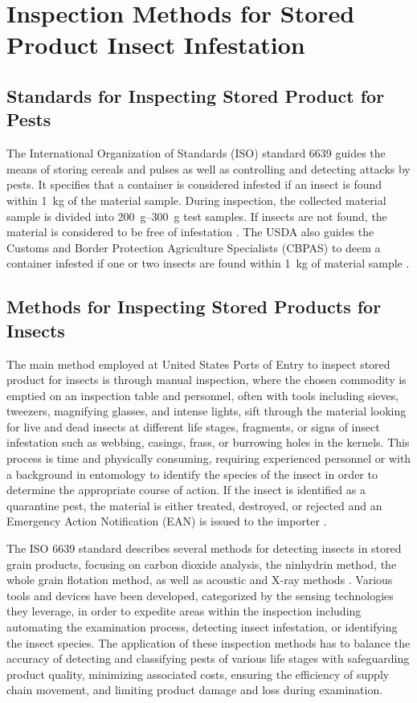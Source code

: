 \documentclass[../Vibro-Acoustic Signatures and Detection Algorithms for Stored Product Insects.tex]{subfiles}
\begin{document}
\newpage
\section{Inspection Methods for Stored Product Insect Infestation}

\subsection{Standards for Inspecting Stored Product for Pests}

The International Organization of Standards (ISO) standard 6639 guides the means of storing cereals and pulses as well as controlling and detecting attacks by pests. It specifies that a container is considered infested if an insect is found within \SI{1}{\kilo\gram} of the material sample. During inspection, the collected material sample is divided into \SIrange{200}{300}{\gram} test samples. If insects are not found, the material is considered to be free of infestation \cite{ISO6639Cereals1986}. The USDA also guides the Customs and Border Protection Agriculture Specialists (CBPAS) to deem a container infested if one or two insects are found within \SI{1}{\kilo\gram} of material sample \cite{service2015a}.

\subsection{Methods for Inspecting Stored Products for Insects}

The main method employed at United States Ports of Entry to inspect stored product for insects is through manual inspection, where the chosen commodity is emptied on an inspection table and personnel, often with tools including sieves, tweezers, magnifying glasses, and intense lights, sift through the material looking for live and dead insects at different life stages, fragments, or signs of insect infestation such as webbing, casings, frass, or burrowing holes in the kernels. This process is time and physically consuming, requiring experienced personnel or with a background in entomology to identify the species of the insect in order to determine the appropriate course of action. If the insect is identified as a quarantine pest, the material is either treated, destroyed, or rejected and an Emergency Action Notification (EAN) is issued to the importer \cite{service2015a}.

The ISO 6639 standard describes several methods for detecting insects in stored grain products, focusing on carbon dioxide analysis, the ninhydrin method, the whole grain flotation method, as well as acoustic and X-ray methods \cite{ISO6639Cereals1986}. Various tools and devices have been developed, categorized by the sensing technologies they leverage, in order to expedite areas within the inspection including automating the examination process, detecting insect infestation, or identifying the insect species. The application of these inspection methods has to balance the accuracy of detecting and classifying pests of various life stages with safeguarding product quality, minimizing associated costs, ensuring the efficiency of supply chain movement, and limiting product damage and loss during examination.
\end{document}
